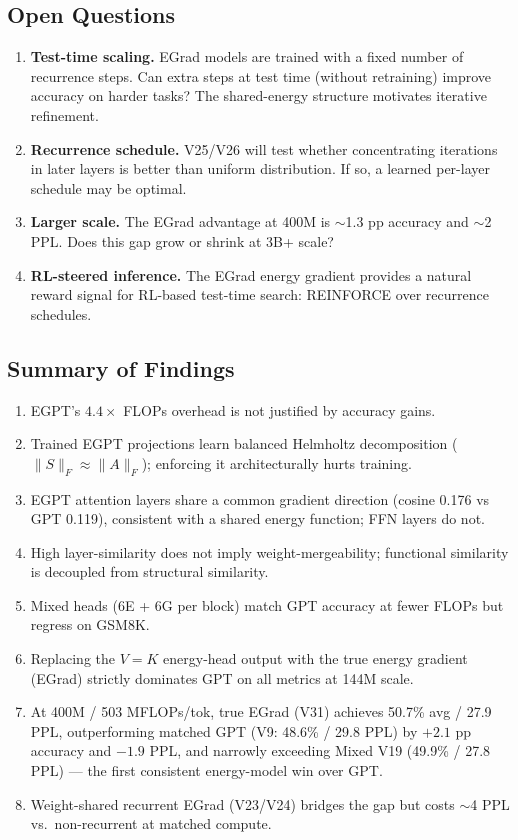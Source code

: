 \subsection{Open Questions}

\begin{enumerate}
  \item \textbf{Test-time scaling.}  EGrad models are trained with a fixed number of
    recurrence steps.  Can extra steps at test time (without retraining) improve
    accuracy on harder tasks?  The shared-energy structure motivates iterative refinement.
  \item \textbf{Recurrence schedule.}  V25/V26 will test whether concentrating iterations
    in later layers is better than uniform distribution.  If so, a learned per-layer
    schedule may be optimal.
  \item \textbf{Larger scale.}  The EGrad advantage at 400M is $\sim$1.3 pp accuracy
    and $\sim$2 PPL.  Does this gap grow or shrink at 3B+ scale?
  \item \textbf{RL-steered inference.}  The EGrad energy gradient provides a natural
    reward signal for RL-based test-time search: REINFORCE over recurrence schedules.
\end{enumerate}

\subsection{Summary of Findings}

\begin{enumerate}
  \item EGPT's $4.4\times$ FLOPs overhead is not justified by accuracy gains.
  \item Trained EGPT projections learn balanced Helmholtz decomposition ($\|S\|_F \approx \|A\|_F$);
    enforcing it architecturally hurts training.
  \item EGPT attention layers share a common gradient direction (cosine 0.176 vs GPT 0.119),
    consistent with a shared energy function; FFN layers do not.
  \item High layer-similarity does not imply weight-mergeability; functional similarity is
    decoupled from structural similarity.
  \item Mixed heads (6E + 6G per block) match GPT accuracy at fewer FLOPs but regress on GSM8K.
  \item Replacing the $V{=}K$ energy-head output with the true energy gradient (EGrad)
    strictly dominates GPT on all metrics at 144M scale.
  \item At 400M / 503 MFLOPs/tok, true EGrad (V31) achieves 50.7\% avg / 27.9 PPL,
    outperforming matched GPT (V9: 48.6\% / 29.8 PPL) by $+2.1$ pp accuracy and $-1.9$ PPL,
    and narrowly exceeding Mixed V19 (49.9\% / 27.8 PPL) --- the first consistent energy-model win over GPT.
  \item Weight-shared recurrent EGrad (V23/V24) bridges the gap but costs $\sim$4 PPL
    vs.\ non-recurrent at matched compute.
\end{enumerate}

